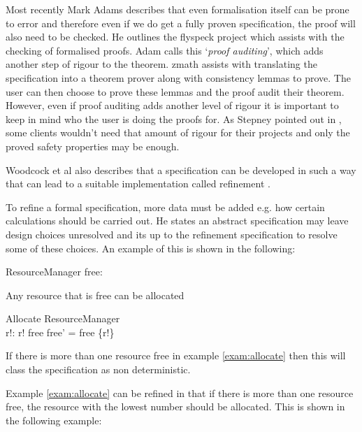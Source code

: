 Most recently Mark Adams \cite{JFR4576} describes that even formalisation itself can be prone to error and therefore even if we do get a fully proven specification, the proof will also need to be checked. He outlines the flyspeck project which assists with the checking of formalised proofs. Adam calls this `\emph{proof auditing}', which adds another step of rigour to the theorem. \gls{zmath} assists with translating the specification into a theorem prover along with consistency lemmas to prove. The user can then choose to prove these lemmas and the proof audit their theorem. However, even if proof auditing adds another level of rigour it is important to keep in mind who the user is doing the proofs for. As Stepney pointed out in \cite{stepney1998tale}, some clients wouldn't need that amount of rigour for their projects and only the proved safety properties may be enough.

Woodcock et al also describes that a specification can be developed in such a way that can lead to a suitable implementation called refinement \cite{Woodcock:1996:UZS:235337}. 

To refine a formal specification, more data must be added e.g. how certain calculations should be carried out. He states an abstract specification may leave design choices unresolved and its up to the refinement specification to resolve some of these choices. An example of this is shown in the following:

\begin{exam}

\begin{schema}{ResourceManager}
free:  \nat
\end{schema}

 Any resource that is free can be allocated

\begin{schema}{Allocate}
\Delta ResourceManager \\
r!: \nat
\where
r! \in free \land free' = free \setminus \{r!\}
\end{schema}

\label{exam:allocate} 
\end{exam}

If there is more than one resource free in example \ref{exam:allocate} then this will class the specification as non deterministic.

Example \ref{exam:allocate} can be refined in that if there is more than one resource free, the resource with the lowest number should be allocated. This is shown in the following example:

